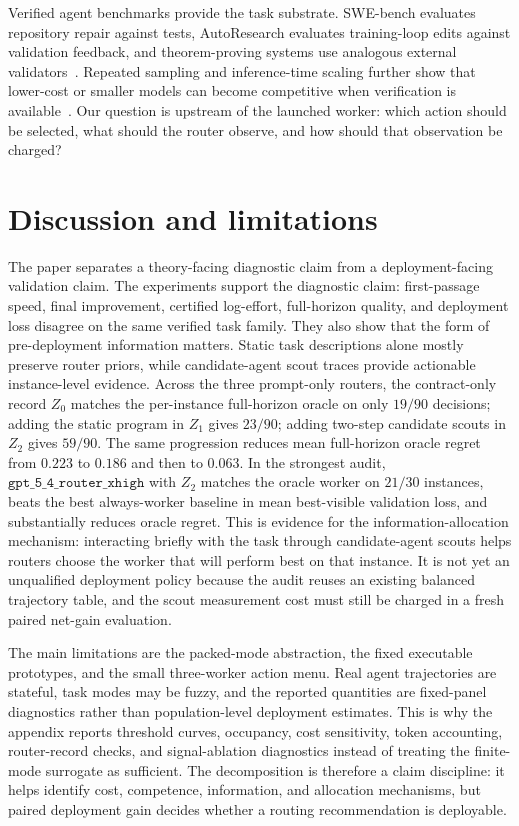 \documentclass{article}
\begin{document}
Verified agent benchmarks provide the task substrate.
SWE-bench evaluates repository repair against tests, AutoResearch evaluates training-loop edits against validation feedback, and theorem-proving systems use analogous external validators~\citep{jimenez2024swebench,karpathy2026autoresearch}.
Repeated sampling and inference-time scaling further show that lower-cost or smaller models can become competitive when verification is available~\citep{brown2024monkeys,snell2025testtime,wu2025inference,osca2024}.
Our question is upstream of the launched worker: which action should be selected, what should the router observe, and how should that observation be charged?

\section{Discussion and limitations}
\label{sec:discussion}

The paper separates a theory-facing diagnostic claim from a deployment-facing validation claim.
The experiments support the diagnostic claim: first-passage speed, final improvement, certified log-effort, full-horizon quality, and deployment loss disagree on the same verified task family.
They also show that the form of pre-deployment information matters.
Static task descriptions alone mostly preserve router priors, while candidate-agent scout traces provide actionable instance-level evidence.
Across the three prompt-only routers, the contract-only record \(Z_0\) matches the per-instance full-horizon oracle on only \(19/90\) decisions; adding the static program in \(Z_1\) gives \(23/90\); adding two-step candidate scouts in \(Z_2\) gives \(59/90\).
The same progression reduces mean full-horizon oracle regret from \(0.223\) to \(0.186\) and then to \(0.063\).
In the strongest audit, \(\texttt{gpt\_5\_4\_router\_xhigh}\) with \(Z_2\) matches the oracle worker on \(21/30\) instances, beats the best always-worker baseline in mean best-visible validation loss, and substantially reduces oracle regret.
This is evidence for the information-allocation mechanism: interacting briefly with the task through candidate-agent scouts helps routers choose the worker that will perform best on that instance.
It is not yet an unqualified deployment policy because the audit reuses an existing balanced trajectory table, and the scout measurement cost must still be charged in a fresh paired net-gain evaluation.

The main limitations are the packed-mode abstraction, the fixed executable prototypes, and the small three-worker action menu.
Real agent trajectories are stateful, task modes may be fuzzy, and the reported quantities are fixed-panel diagnostics rather than population-level deployment estimates.
This is why the appendix reports threshold curves, occupancy, cost sensitivity, token accounting, router-record checks, and signal-ablation diagnostics instead of treating the finite-mode surrogate as sufficient.
The decomposition is therefore a claim discipline: it helps identify cost, competence, information, and allocation mechanisms, but paired deployment gain decides whether a routing recommendation is deployable.
\end{document}

